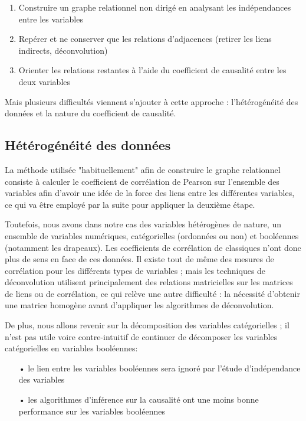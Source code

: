 \documentclass[11pt,fleqn,a4paper,openany,frenchb]{book} %
\begin{document}
\begin{enumerate}
\item Construire un graphe relationnel non dirigé en analysant les indépendances entre les variables
\item Repérer et ne conserver que les relations d'adjacences (retirer les liens indirects, déconvolution)
\item Orienter les relations restantes à l'aide du coefficient de causalité entre les deux variables 
\end{enumerate}

Mais plusieurs difficultés viennent s'ajouter à cette approche : l'hétérogénéité des données et la nature du coefficient de causalité.

\subsection{Hétérogénéité des données}

La méthode utilisée "habituellement" afin de construire le graphe relationnel consiste à calculer le coefficient de corrélation de Pearson sur l'ensemble des variables afin d'avoir une idée de la force des liens entre les différentes variables, ce qui va être employé par la suite pour appliquer la deuxième étape.\par

Toutefois, nous avons dans notre cas des variables hétérogènes de nature, un ensemble de variables numériques, catégorielles (ordonnées ou non) et booléennes (notamment les drapeaux). Les coefficients de corrélation de classiques n'ont donc plus de sens en face de ces données. Il existe tout de même des mesures de corrélation pour les différents types de variables ; mais les techniques de déconvolution utilisent principalement des relations matricielles sur les matrices de liens ou de corrélation, ce qui relève une autre difficulté : la nécessité d'obtenir une matrice homogène avant d'appliquer les algorithmes de déconvolution.\par

De plus, nous allons revenir sur la décomposition des variables catégorielles ; il n'est pas utile voire contre-intuitif de continuer de décomposer les variables catégorielles en variables booléennes:
\begin{itemize}
\item[•] le lien entre les variables booléennes sera ignoré par l'étude d'indépendance des variables
\item[•] les algorithmes d'inférence sur la causalité ont une moins bonne performance sur les variables booléennes
\end{itemize}
\end{document}
